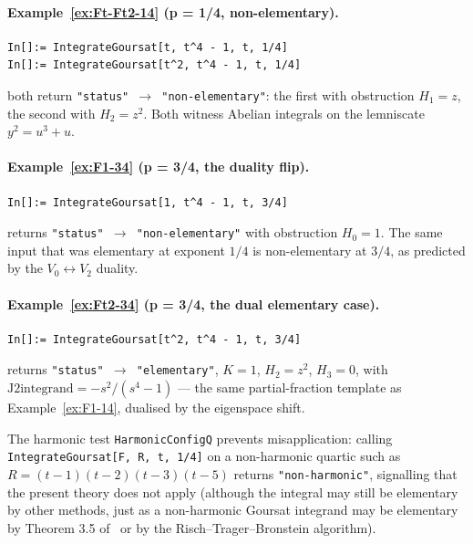 \documentclass[11pt,a4paper]{article}
\theoremstyle{plain}
\theoremstyle{definition}
\theoremstyle{remark}
\begin{document}
\paragraph{Example~\ref{ex:Ft-Ft2-14} (p = 1/4, non-elementary).}
\begin{lstlisting}[basicstyle=\footnotesize\ttfamily,frame=none]
In[]:= IntegrateGoursat[t, t^4 - 1, t, 1/4]
In[]:= IntegrateGoursat[t^2, t^4 - 1, t, 1/4]
\end{lstlisting}
both return \texttt{"status"\,$\to$\,"non-elementary"}: the first with obstruction $H_1 = z$, the second with $H_2 = z^2$. Both witness Abelian integrals on the lemniscate $y^2 = u^3 + u$.

\paragraph{Example~\ref{ex:F1-34} (p = 3/4, the duality flip).}
\begin{lstlisting}[basicstyle=\footnotesize\ttfamily,frame=none]
In[]:= IntegrateGoursat[1, t^4 - 1, t, 3/4]
\end{lstlisting}
returns \texttt{"status"\,$\to$\,"non-elementary"} with obstruction $H_0 = 1$. The same input that was elementary at exponent $1/4$ is non-elementary at $3/4$, as predicted by the $V_0 \leftrightarrow V_2$ duality.

\paragraph{Example~\ref{ex:Ft2-34} (p = 3/4, the dual elementary case).}
\begin{lstlisting}[basicstyle=\footnotesize\ttfamily,frame=none]
In[]:= IntegrateGoursat[t^2, t^4 - 1, t, 3/4]
\end{lstlisting}
returns \texttt{"status"\,$\to$\,"elementary"}, $K = 1$, $H_2 = z^2$, $H_3 = 0$, with $\text{J2integrand} = -s^2/(s^4-1)$ — the same partial-fraction template as Example~\ref{ex:F1-14}, dualised by the eigenspace shift.

\medskip
\noindent
The harmonic test \texttt{HarmonicConfigQ} prevents misapplication: calling \texttt{IntegrateGoursat[F, R, t, 1/4]} on a non-harmonic quartic such as $R = (t-1)(t-2)(t-3)(t-5)$ returns \texttt{"non-harmonic"}, signalling that the present theory does not apply (although the integral may still be elementary by other methods, just as a non-harmonic Goursat integrand may be elementary by Theorem 3.5 of~\cite{GoursatCubic} or by the Risch--Trager--Bronstein algorithm).
\end{document}
